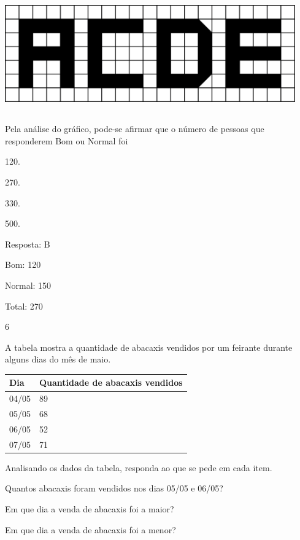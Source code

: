 \begin{escolha}
{\begin{escolha}
{%

\includegraphics[width=4.92543in,height=1.97517in]{media/image96.png}

Pela análise do gráfico, pode-se afirmar que o número de pessoas que
responderem Bom ou Normal foi

\begin{escolha}
\item
  120.
\item
  270.
\item
  330.
\item
  500.
\end{escolha}

Resposta: B

Bom: 120

Normal: 150

Total: 270

\num{6}

A tabela mostra a quantidade de abacaxis vendidos por um feirante
durante alguns dias do mês de maio.

\begin{longtable}[]{@{}ll@{}}
\toprule
Dia & Quantidade de abacaxis vendidos\tabularnewline
\midrule
\endhead
04/05 & 89\tabularnewline
05/05 & 68\tabularnewline
06/05 & 52\tabularnewline
07/05 & 71\tabularnewline
\bottomrule
\end{longtable}

Analisando os dados da tabela, responda ao que se pede em cada item.

\begin{escolha}
  \item
  Quantos abacaxis foram vendidos nos dias 05/05 e 06/05?

\item
  Em que dia a venda de abacaxis foi a maior?

\item
  Em que dia a venda de abacaxis foi a menor?
\end{escolha}

}
\end{escolha}}
\end{escolha}
